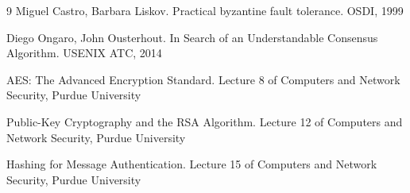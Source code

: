 \begin{thebibliography}{9}
Miguel Castro, Barbara Liskov. Practical byzantine fault tolerance. OSDI, 1999

Diego Ongaro, John Ousterhout. In Search of an Understandable Consensus Algorithm. USENIX ATC, 2014

AES: The Advanced Encryption Standard. Lecture 8 of Computers and Network Security, Purdue University

Public-Key Cryptography and the RSA Algorithm. Lecture 12 of Computers and Network Security, Purdue University

Hashing for Message Authentication. Lecture 15 of Computers and Network Security, Purdue University

\end{thebibliography}
